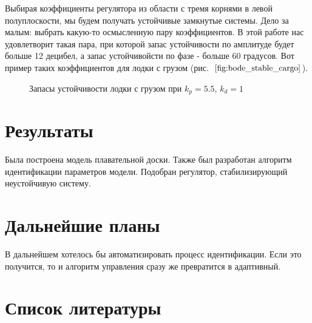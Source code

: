 \documentclass[a4paper]{article}
\begin{document}
Выбирая коэффициенты регулятора из области с тремя корнями в левой полуплоскости, мы будем получать устойчивые замкнутые системы. Дело за малым: выбрать какую-то осмысленную пару коэффициентов. В этой работе нас удовлетворит такая пара, при которой запас устойчивости по амплитуде будет больше 12 децибел, а запас устойчивойсти по фазе - больше 60 градусов. Вот пример таких коэффициентов для лодки с грузом (рис.~$\ref{fig:bode_stable_cargo}$). 

\begin{figure}
	\caption{Запасы устойчивости лодки с грузом при $k_p=5.5$, $k_d=1$}
	\label{fig:bode_stable_cargo}
\end{figure}

\section{Результаты}

Была построена модель плавательной доски. Также был разработан алгоритм идентификации параметров модели. Подобран регулятор, стабилизирующий неустойчивую систему.


\section{Дальнейшие планы}

В дальнейшем хотелось бы автоматизировать процесс идентификации. Если это получится, то и алгоритм управления сразу же превратится в адаптивный.

\section{Список литературы}
\end{document}
